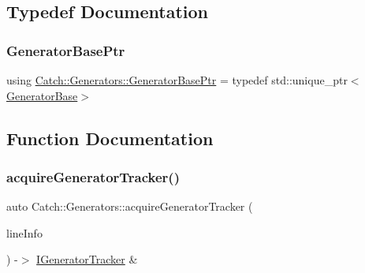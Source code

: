 \subsection{Typedef Documentation}
\mbox{\label{namespace_catch_1_1_generators_a24d632802570d314c18d00a2ea5e33d1}} 
\subsubsection{\texorpdfstring{Generator\+Base\+Ptr}{GeneratorBasePtr}}
{\footnotesize\ttfamily using \mbox{\hyperlink{namespace_catch_1_1_generators_a24d632802570d314c18d00a2ea5e33d1}{Catch\+::\+Generators\+::\+Generator\+Base\+Ptr}} = typedef std\+::unique\+\_\+ptr$<$\mbox{\hyperlink{class_catch_1_1_generators_1_1_generator_base}{Generator\+Base}}$>$}



\subsection{Function Documentation}
\mbox{\label{namespace_catch_1_1_generators_a36413e3baec520d89d21bea23b7bea5b}} 
\subsubsection{\texorpdfstring{acquire\+Generator\+Tracker()}{acquireGeneratorTracker()}}
{\footnotesize\ttfamily auto Catch\+::\+Generators\+::acquire\+Generator\+Tracker (\begin{DoxyParamCaption}\item[{\mbox{\hyperlink{struct_catch_1_1_source_line_info}{Source\+Line\+Info}} const \&}]{line\+Info }\end{DoxyParamCaption}) -\/$>$  \mbox{\hyperlink{struct_catch_1_1_i_generator_tracker}{I\+Generator\+Tracker}} \&}

\mbox{\label{namespace_catch_1_1_generators_a4f9b91d73905007d0e595ddde14c1c88}} 
